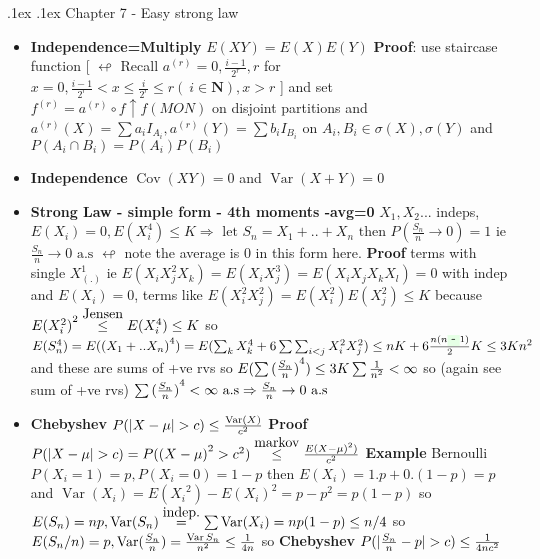 \documentclass[10pt,landscape,a4paper]{article}
\makeatletter
\renewcommand{\section}{\@startsection{section}{1}{0mm}%
                                {.1ex}%
                                {.1ex}%
                                {\color{blue}\sffamily\small\bfseries}}
\newcommand\myeq[1]{\stackrel{{\normalfont\mbox{#1}}}{ = }}
\newcommand\myle[1]{\stackrel{{\normalfont\mbox{#1}}}{ \le }}
\newcommand{\Var}{ \operatorname{Var} }
\makeatother
\begin{document}
\begin{multicols*}{3}
\begin{spacing}{0.5}
\begin{itemize}
\end{itemize}

\section{Chapter 7 - Easy strong law}

\begin{itemize}

\item \textbf{Independence=Multiply} $E(XY)=E(X)E(Y)$ \textbf{Proof}: use staircase function [ $\looparrowleft$ Recall  $a^{(r)}=0,\frac{i-1}{2^r},r$ for $x=0,\frac{i-1}{2^r} < x \le \frac{i}{2^r} \le r (\ i \in \mathbf{N}) , x>r$ ] and set $ f^{(r)}=a^{(r)} \circ f \uparrow f (MON)$ on disjoint partitions and $a^{(r)}(X)=\sum a_i I_{A_i} , a^{(r)}(Y)=\sum b_i I_{B_i} $ on $A_i,B_i \in \sigma(X),\sigma(Y)$ and $P(A_i \cap B_i)=P(A_i)P(B_i)$

\item \textbf{Independence} $\operatorname{Cov}(XY)=0$ and $\operatorname{Var}(X+Y)=0$

\item \textbf{Strong Law - simple form - 4th moments -avg=0} $X_1,X_2...$ indeps, $E(X_i)=0,E(X_i^4)\le K \Rightarrow \text{ let } S_n=X_1+..+X_n \text{ then } P( \frac{S_n}{n}\rightarrow 0)=1$ ie $\frac{S_n}{n} \rightarrow 0 \text{ a.s}$ $\looparrowleft$ note the average is 0 in this form here. \textbf{Proof} terms with single $X_(.)^1$ ie $E(X_iX_j^2X_k)=E(X_iX_j^3)=E(X_iX_jX_kX_l)=0$ with indep and $E(X_i)=0$, terms like $E(X_i^2X_j^2)=E(X_i^2)E(X_j^2) \le K$ because $ {E(X_i^2)}^2 \myle{Jensen} E(X_i^4) \le K$ so $E(S_n^4)=E( {(X_1+..X_n)}^4 )=E(\sum_k X_k^4 + 6 \sum\sum_{i<j} X_i^2X_j^2) \le nK + 6\frac{n(n\colorbox{green!10}{-}1)}{2}K \le 3Kn^2$ and these are sums of +ve rvs so $E(\sum {(\frac{S_n}{n})}^4 ) \le 3K \sum {1 \over {n^2}} < \infty$ so (again see sum of +ve rvs) $\sum {(\frac{S_n}{n})}^4 < \infty \text{ a.s} \Rightarrow {S_n \over n} \rightarrow 0 \text{ a.s}$

\item \colorbox{green!10}{\textbf{Chebyshev} $P(|X-\mu| >c) \le {\operatorname{Var}(X) \over {c^2}} $} \textbf{Proof} $P(|X-\mu| > c) = P( {(X-\mu)}^2 > c^2) \myle{markov} {{E{ (X-\mu)}^2) } \over {c^2}}$ \textbf{Example} Bernoulli $P(X_i=1)=p, P(X_i=0)=1-p$ then $E(X_i)=1.p+0.(1-p)=p$ and $\Var(X_i)=E({X_i}^2)-E(X_i)^2=p-p^2=p(1-p)$ so $E(S_n)=np,\Var(S_n) \myeq{indep.} \sum \Var(X_i)=np(1-p) \le n/4 $ so $E(S_n/n)=p, \Var({S_n \over n})={\Var{S_n} \over {n^2}} \le {1 \over {4n}} $ so \textbf{Chebyshev} $P(| {S_n \over n}-p|>c) \le { 1 \over {4nc^2} } $ 


\end{itemize}
\end{spacing}
\end{multicols*}
\end{document}
